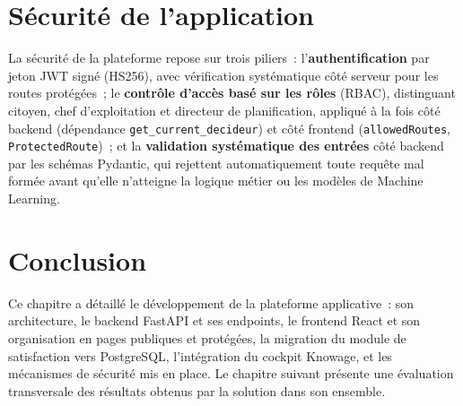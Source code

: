 \section{S\'ecurit\'e de l'application}
\label{sec:securite-app}
La s\'ecurit\'e de la plateforme repose sur trois piliers~: l'\textbf{authentification} par jeton JWT sign\'e (HS256), avec v\'erification syst\'ematique c\^ot\'e serveur pour les routes prot\'eg\'ees~; le \textbf{contr\^ole d'acc\`es bas\'e sur les r\^oles} (RBAC), distinguant citoyen, chef d'exploitation et directeur de planification, appliqu\'e \`a la fois c\^ot\'e backend (d\'ependance \texttt{get\_current\_decideur}) et c\^ot\'e frontend (\texttt{allowedRoutes}, \texttt{ProtectedRoute})~; et la \textbf{validation syst\'ematique des entr\'ees} c\^ot\'e backend par les sch\'emas Pydantic, qui rejettent automatiquement toute requ\^ete mal form\'ee avant qu'elle n'atteigne la logique m\'etier ou les mod\`eles de Machine Learning.

\section{Conclusion}
Ce chapitre a d\'etaill\'e le d\'eveloppement de la plateforme applicative~: son architecture, le backend FastAPI et ses endpoints, le frontend React et son organisation en pages publiques et prot\'eg\'ees, la migration du module de satisfaction vers PostgreSQL, l'int\'egration du cockpit Knowage, et les m\'ecanismes de s\'ecurit\'e mis en place. Le chapitre suivant pr\'esente une \'evaluation transversale des r\'esultats obtenus par la solution dans son ensemble.

\clearpage
